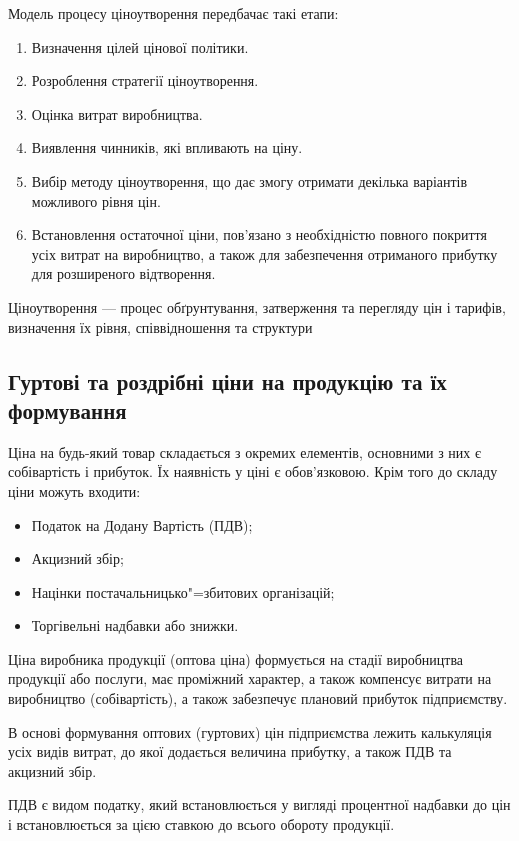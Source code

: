 \documentclass[a5paper,10pt,notitlepage,pdftex,headsepline]{scrartcl}
\begin{document}
    Модель процесу ціноутворення передбачає такі етапи:
    \begin{enumerate}
      \item Визначення цілей цінової політики.
      \item Розроблення стратегії ціноутворення.
      \item Оцінка витрат виробництва.
      \item Виявлення чинників, які впливають на ціну.
      \item Вибір методу ціноутворення, що дає змогу отримати декілька
        варіантів можливого рівня цін.
      \item Встановлення остаточної ціни, пов’язано з необхідністю повного
        покриття усіх витрат на виробництво, а також для забезпечення
        отриманого прибутку для розширеного відтворення.
    \end{enumerate}

    Ціноутворення --- процес обґрунтування, затверження та перегляду цін і
    тарифів, визначення їх рівня, співвідношення та структури
  \subsection{Гуртові та роздрібні ціни на продукцію та їх формування}
    Ціна на будь-який товар складається з окремих елементів, основними з них є
    собівартість і прибуток.
    Їх наявність у ціні є обов’язковою.
    Крім того до складу ціни можуть входити:
    \begin{itemize}
      \item Податок на Додану Вартість (ПДВ);
      \item Акцизний збір;
      \item Націнки постачальницько"=збитових організацій;
      \item Торгівельні надбавки або знижки.
    \end{itemize}

    Ціна виробника продукції (оптова ціна) формується на стадії виробництва
    продукції або послуги, має проміжний характер, а також компенсує витрати
    на виробництво (собівартість), а також забезпечує плановий прибуток
    підприємству.

    В основі формування оптових (гуртових) цін підприємства лежить калькуляція
    усіх видів витрат, до якої додається величина прибутку, а також ПДВ та
    акцизний збір.

    ПДВ є видом податку, який встановлюється у вигляді процентної надбавки до
    цін і встановлюється за цією ставкою до всього обороту продукції.
\end{document}
